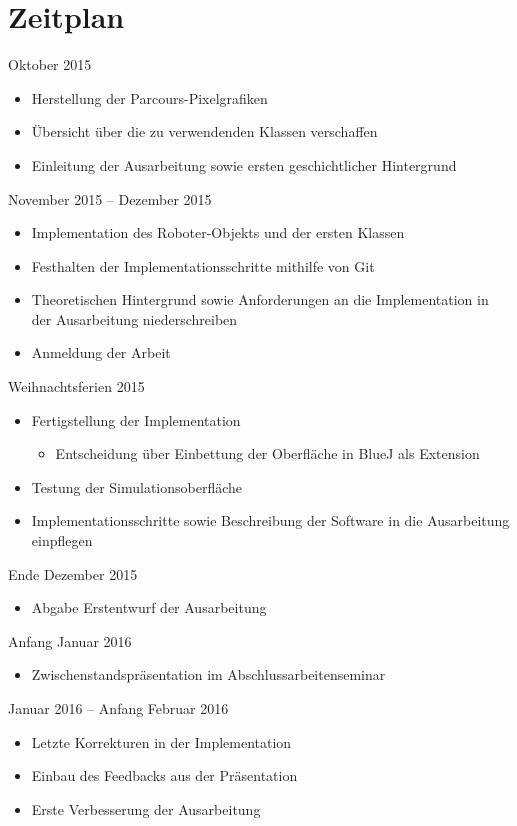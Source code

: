 \documentclass[paper=a4, pagesize, DIV=calc, BCOR=12.5mm, twoside=on, onecolumn=on, open = any, titlepage =on, parskip =half-, headsepline = on, footsepline = on, chapterprefix = on, appendixprefix = off, fontsize = 12pt, numbers = noenddot, abstract = on]{scrbook}
\numberwithin{equation}{chapter}
\begin{document}
\par \singlespacing
\section*{Zeitplan}
\onehalfspacing
Oktober 2015 
\begin{itemize}
\item Herstellung der Parcours-Pixelgrafiken
\item	Übersicht über die zu verwendenden Klassen verschaffen
\item	Einleitung der Ausarbeitung sowie ersten geschichtlicher Hintergrund
\end{itemize}

November 2015 – Dezember 2015
\begin{itemize}
\item	Implementation des Roboter-Objekts und der ersten Klassen
\item	Festhalten der Implementationsschritte mithilfe von Git
\item	Theoretischen Hintergrund sowie Anforderungen an die Implementation in der Ausarbeitung niederschreiben
\item	Anmeldung der Arbeit
\end{itemize}

Weihnachtsferien 2015 
\begin{itemize}
\item	Fertigstellung der Implementation
\begin{itemize}
\item Entscheidung über Einbettung der Oberfläche in BlueJ als Extension
\end{itemize}
\item	Testung der Simulationsoberfläche
\item	Implementationsschritte sowie Beschreibung der Software in die Ausarbeitung einpflegen
\end{itemize}

Ende Dezember 2015
\begin{itemize}
\item 	Abgabe Erstentwurf der Ausarbeitung
\end{itemize}

Anfang Januar 2016
\begin{itemize}
\item Zwischenstandspräsentation im Abschlussarbeitenseminar
\end{itemize}

Januar 2016 – Anfang Februar 2016
\begin{itemize}
\item Letzte Korrekturen in der Implementation
\item	Einbau des Feedbacks aus der Präsentation
\item	Erste Verbesserung der Ausarbeitung
\end{itemize}
\end{document}
